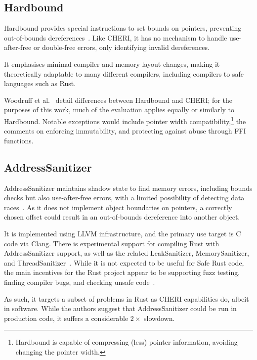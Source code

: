 \documentclass[dissertation.tex]{subfiles}
\begin{document}


\subsection{Hardbound}
\label{sec:rel-hardbound}

Hardbound provides special instructions to set bounds on pointers,
preventing out-of-bounds dereferences~\cite{devietti-hardbound}.
Like CHERI, it has no mechanism to handle use-after-free or double-free
errors, only identifying invalid dereferences.

It emphasises minimal compiler and memory layout changes, making it
theoretically adaptable to many different compilers, including compilers
to safe languages such as Rust.

Woodruff et al.~\cite{cheri-risc-2014} detail differences between
Hardbound and CHERI; for the purposes of this work, much of the
evaluation applies equally or similarly to Hardbound.
Notable exceptions would include pointer width compatibility,\footnote{
Hardbound is capable of compressing (less) pointer information, avoiding
changing the pointer width.
} the comments on enforcing immutability, and protecting against abuse
through FFI functions.


\subsection{AddressSanitizer}
\label{sec:rel-asan}

AddressSanitizer maintains shadow state to find memory errors, including
bounds checks but also use-after-free errors, with a limited possibility
of detecting data races~\cite{serebryany-asan}.
As it does not implement object boundaries on pointers, a correctly
chosen offset could result in an out-of-bounds dereference into another
object.

It is implemented using LLVM infrastructure, and the primary use target
is C code via Clang.
There is experimental support for compiling Rust with AddressSanitizer
support, as well as the related LeakSanitizer, MemorySanitizer, and
ThreadSanitizer~\cite{rust-san}.
While it is not expected to be useful for Safe Rust code, the main
incentives for the Rust project appear to be supporting fuzz testing,
finding compiler bugs, and checking unsafe code~\cite{rust-asan-track}.

As such, it targets a subset of problems in Rust as CHERI capabilities
do, albeit in software.
While the authors suggest that AddressSanitizer could be run in
production code, it suffers a considerable \(2\times\) slowdown.
\end{document}
